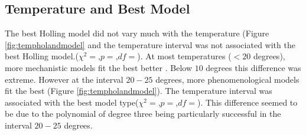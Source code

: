 \documentclass{article}
\begin{document}
\subsection{Temperature and Best Model}
The best Holling model did not vary much with the temperature (Figure \ref{fig:tempholandmodel} and the temperature interval was not associated with the best Holling model.($\chi^2=$,$p=$,$df=$). At most temperatures ($<20$ degrees), more mechanistic models fit the best better . Below $10$ degrees this difference was extreme. However at the interval $20-25$ degrees, more phenomenological models fit the best (Figure \ref{fig:tempholandmodel}).  The temperature interval was associated with the best model type($\chi^2=$,$p=$,$df=$). This difference seemed to be due to the polynomial of degree three being particularly successful in the interval $20-25$ degrees.
\end{document}
